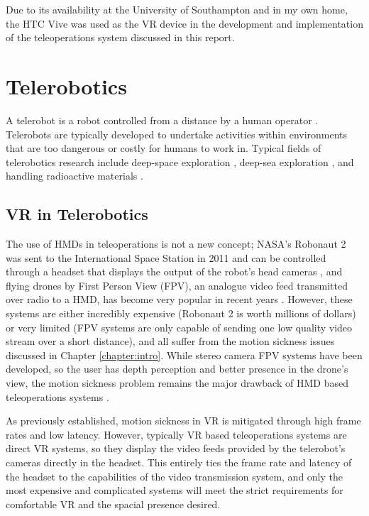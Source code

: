 Due to its availability at the University of Southampton and in my own home, the HTC Vive was used as the VR device in the development and implementation of the teleoperations system discussed in this report. 

\section{Telerobotics}

A telerobot is a robot controlled from a distance by a human operator \cite{NAP4761}. Telerobots are typically developed to undertake activities within environments that are too dangerous or costly for humans to work in. Typical fields of telerobotics research include deep-space exploration \cite{fong2017interactive}, deep-sea exploration \cite{huvenne2018rovs}, and handling radioactive materials \cite{smith2017radiation}.

\subsection{VR in Telerobotics}
\label{subsection:VRTele}

The use of HMDs in teleoperations is not a new concept; NASA's Robonaut 2 was sent to the International Space Station in 2011 and can be controlled through a headset that displays the output of the robot's head cameras \cite{Robonaut}, and flying drones by First Person View (FPV), an analogue video feed transmitted over radio to a HMD, has become very popular in recent years \cite{FPV}. However, these systems are either incredibly expensive (Robonaut 2 is worth millions of dollars) or very limited (FPV systems are only capable of sending one low quality video stream over a short distance), and all suffer from the motion sickness issues discussed in Chapter \ref{chapter:intro}. While stereo camera FPV systems have been developed, so the user has depth perception and better presence in the drone's view, the motion sickness problem remains the major drawback of HMD based teleoperations systems \cite{2FPV}.

As previously established, motion sickness in VR is mitigated through high frame rates and low latency. However, typically VR based teleoperations systems are direct VR systems, so they display the video feeds provided by the telerobot's cameras directly in the headset. This entirely ties the frame rate and latency of the headset to the capabilities of the video transmission system, and only the most expensive and complicated systems will meet the strict requirements for comfortable VR and the spacial presence desired.

